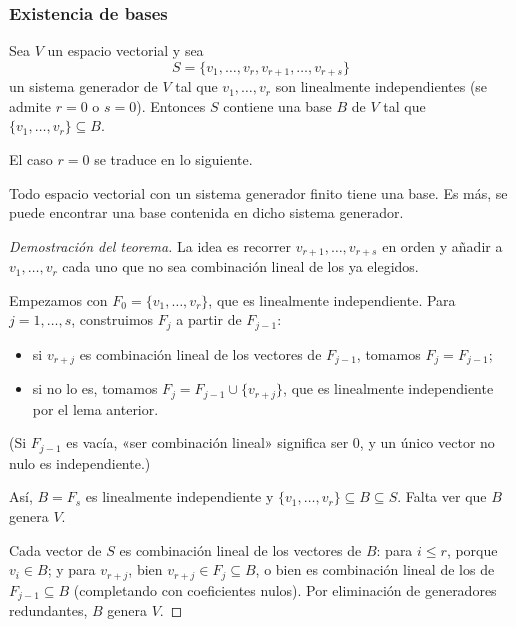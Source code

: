 \begin{frame}[allowframebreaks,t]
    \frametitle{Existencia de bases}

    \begin{theorem}
        Sea \(V\) un espacio vectorial y sea
        \[
            S=\{v_1,\ldots,v_r,v_{r+1},\ldots,v_{r+s}\}
        \]
        un sistema generador de \(V\) tal que \(v_1,\ldots,v_r\) son
        linealmente independientes (se admite \(r=0\) o \(s=0\)). Entonces \(S\)
        contiene una base \(B\) de \(V\) tal que
        \(\{v_1,\ldots,v_r\}\subseteq B\).
    \end{theorem}

    \medskip

    El caso \(r=0\) se traduce en lo siguiente.

    \begin{corollary}
        Todo espacio vectorial con un sistema generador finito tiene una base. Es más, se puede encontrar una base contenida en dicho sistema generador.
    \end{corollary}

    \framebreak

    \begin{proof}[Demostración del teorema]
        La idea es recorrer \(v_{r+1},\ldots,v_{r+s}\) en orden y añadir
        a \(v_1,\ldots,v_r\) cada uno que no sea combinación lineal de los
        ya elegidos.

        \medskip

        Empezamos con \(F_0=\{v_1,\ldots,v_r\}\), que es linealmente
        independiente. Para \(j=1,\ldots,s\), construimos \(F_j\) a partir
        de \(F_{j-1}\):
        \begin{itemize}
            \item si \(v_{r+j}\) es combinación lineal de los vectores de
                  \(F_{j-1}\), tomamos \(F_j=F_{j-1}\);
            \item si no lo es, tomamos \(F_j=F_{j-1}\cup\{v_{r+j}\}\), que es
                  linealmente independiente por el lema anterior.
        \end{itemize}
        (Si \(F_{j-1}\) es vacía, «ser combinación lineal» significa
        ser \(0\), y un único vector no nulo es independiente.)

        \framebreak

        Así, \(B=F_s\) es linealmente independiente y
        \(\{v_1,\ldots,v_r\}\subseteq B\subseteq S\). Falta ver que $B$ 
        \alert{genera} \(V\).

        \medskip

        Cada vector de \(S\) es combinación lineal de los vectores de
        \(B\): para \(i\leq r\), porque \(v_i\in B\); y para \(v_{r+j}\),
        bien \(v_{r+j}\in F_j\subseteq B\), o bien es combinación lineal
        de los de \(F_{j-1}\subseteq B\) (completando con coeficientes
        nulos). Por eliminación de generadores redundantes, \(B\) genera \(V\).
    \end{proof}
\end{frame}


